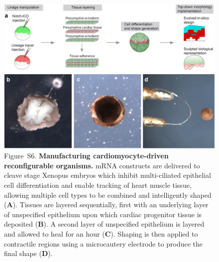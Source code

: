 \begin{figure}[t]
\centering
\includegraphics[width=\linewidth]{Chapter07/img/manufactureprocess2.png}
\caption*{Figure~S6.  \textbf{Manufacturing cardiomyocyte-driven reconfigurable organisms.} 
mRNA constructs are delivered to cleave stage Xenopus embryos which inhibit multi-ciliated epithelial cell differentiation and enable tracking of heart muscle tissue, allowing multiple cell types to be combined and intelligently shaped (\textbf{A}). 
Tissues are layered sequentially, first with an underlying layer of unspecified epithelium upon which cardiac progenitor tissue is deposited (\textbf{B}). 
A second layer of unspecified epithelium is layered and allowed to heal for an hour (\textbf{C}). 
Shaping is then applied to contractile regions using a microcautery electrode to produce the final shape (\textbf{D}).
}
\end{figure}

